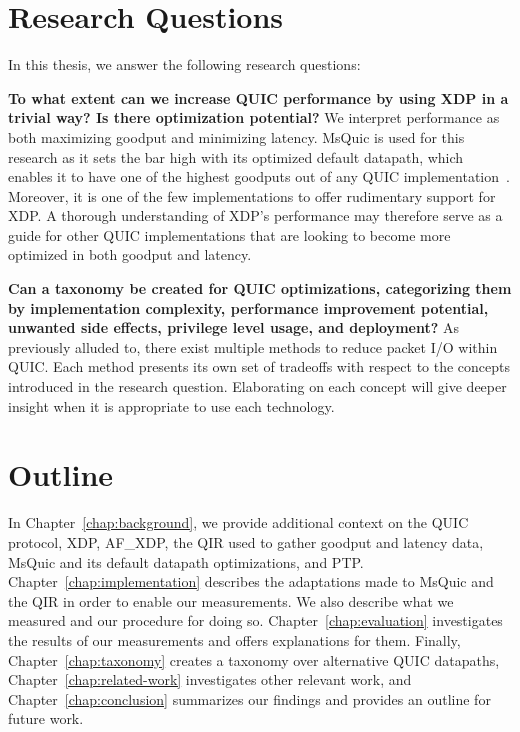 \section{Research Questions}
\label{sec:research-questions}

In this thesis, we answer the following research questions:

\textbf{To what extent can we increase QUIC performance by using XDP in a trivial way? Is there optimization potential?} We interpret performance as both maximizing goodput and minimizing latency. MsQuic is used for this research as it sets the bar high with its optimized default datapath, which enables it to have one of the highest goodputs out of any QUIC implementation~\cite{spaeth2023}. Moreover, it is one of the few implementations to offer rudimentary support for \ac{XDP}. A thorough understanding of XDP's performance may therefore serve as a guide for other QUIC implementations that are looking to become more optimized in both goodput and latency.

\textbf{Can a taxonomy be created for QUIC optimizations, categorizing them by implementation complexity, performance improvement potential, unwanted side effects, privilege level usage, and deployment?} As previously alluded to, there exist multiple methods to reduce packet I/O within QUIC. Each method presents its own set of tradeoffs with respect to the concepts introduced in the research question. Elaborating on each concept will give deeper insight when it is appropriate to use each technology.

\section{Outline}
\label{sec:outline}

In Chapter~\ref{chap:background}, we provide additional context on the QUIC protocol, \ac{XDP}, AF\_XDP, the \ac{QIR} used to gather goodput and latency data, MsQuic and its default datapath optimizations, and \ac{PTP}. Chapter~\ref{chap:implementation} describes the adaptations made to MsQuic and the \ac{QIR} in order to enable our measurements. We also describe what we measured and our procedure for doing so. Chapter~\ref{chap:evaluation} investigates the results of our measurements and offers explanations for them. Finally, Chapter~\ref{chap:taxonomy} creates a taxonomy over alternative QUIC datapaths, Chapter~\ref{chap:related-work} investigates other relevant work, and Chapter~\ref{chap:conclusion} summarizes our findings and provides an outline for future work.
